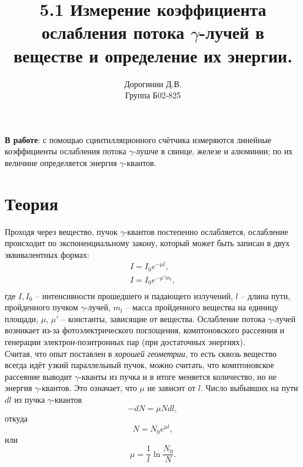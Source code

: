 \documentclass[a4paper,12pt]{article}
\author{Дорогинин Д.В.\\
Группа Б02-825}
\title{5.1 Измерение коэффициента ослабления потока $\gamma$-лучей в веществе и определение их энергии.}
\date{\vspace{-10pt}}
\begin{document}
\maketitle
\textbf{В работе}: с помощью сцинтилляционного счётчика измеряются линейные коэффициенты ослабления потока $\gamma$-лушче в свинце, железе и алюминии; по их величине определяется энергия $\gamma$-квантов.
\section*{Теория}
Проходя через вещество, пучок $\gamma$-квантов постепенно ослабляется, ослабление происходит по экспоненциальному закону, который может быть записан в двух эквивалентных формах:
\[\begin{array}{l}
I = I_0 e^{-\mu l} ,\\
I = I_0 e^{-\mu' m_l},\\
\end{array}\]
где $I, I_0$ -- интенсивности прошедшего и падающего излучений, $l$ -- длина пути, пройденного пучком $\gamma$-лучей, $m_l$ -- масса пройденного вещества на единицу площади, $\mu$, $\mu'$ -- константы, зависящие от вещества. Ослабление потока $\gamma$-лучей возникает из-за фотоэлектрического поглощения, комптоновского рассеяния и генерации электрон-позитронных пар (при достаточных энергиях).\\
Считая, что опыт поставлен в \textit{хорошей геометрии}, то есть сквозь вещество всегда идёт узкий параллельный пучок, можно считать, что комптоновское рассеяние выводит $\gamma$-кванты из пучка и в итоге меняется количество, но не энергия $\gamma$-квантов. Это означает, что $\mu$ не зависит от $l$. Число выбывших на пути $dl$ из пучка $\gamma$-квантов
\[-dN = \mu N dl,\]
откуда
\[N = N_0 e^{\mu l},\]
или
\begin{equation}
\mu = \dfrac{1}{l} \ln \dfrac{N_0}{N}.
\end{equation}
\end{document}

